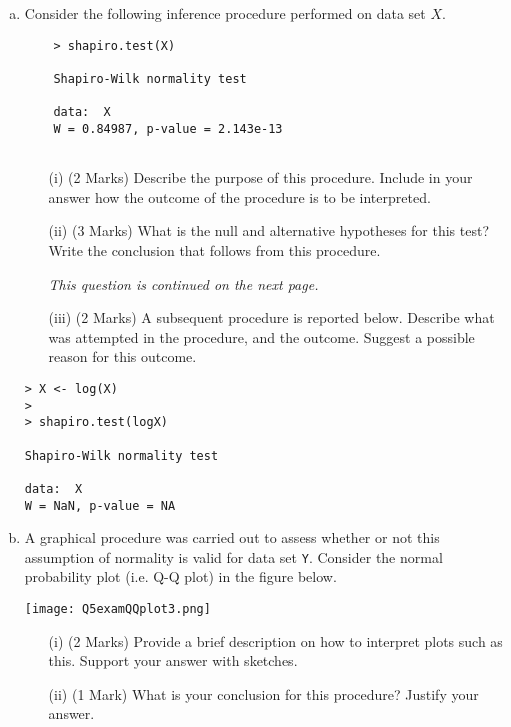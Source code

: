 \begin{enumerate}
\begin{enumerate}[(a)]
\item 
Consider the following inference procedure performed on data set $X$.
\begin{framed}
	\begin{verbatim}
	> shapiro.test(X)
	
	Shapiro-Wilk normality test
	
	data:  X
	W = 0.84987, p-value = 2.143e-13
	
	\end{verbatim}
\end{framed}


\begin{itemize}
	\item[(i)] (2 Marks) Describe the purpose of this procedure. Include in your answer how the outcome of the procedure is to be interpreted.
	\item[(ii)] (3 Marks) What is the null and alternative hypotheses for this test? Write the conclusion that follows from this procedure.
\medskip


\noindent \textit{This question is continued on the next page.}
	
\newpage	
\item[(iii)] (2 Marks) A subsequent procedure is reported below. Describe what was attempted in the procedure, and the outcome. Suggest a possible reason for this outcome.
\end{itemize}

\begin{framed}
\begin{verbatim}
> X <- log(X)
>
> shapiro.test(logX)
	
Shapiro-Wilk normality test
	
data:  X
W = NaN, p-value = NA
\end{verbatim}
\end{framed}




\item A graphical procedure was carried out to assess whether or not this assumption of normality is valid for data set \texttt{Y}. Consider the normal probability plot (i.e. Q-Q plot) in the figure below.

\begin{center}
	\texttt{[image: Q5examQQplot3.png]}
\end{center}

\begin{itemize}
	\item[(i)] (2 Marks) Provide a brief description on how to interpret plots such as this. Support your answer with sketches.
	\item[(ii)] (1 Mark) What is your conclusion for this procedure? Justify your answer.
\end{itemize}


\end{enumerate}
\end{enumerate}
